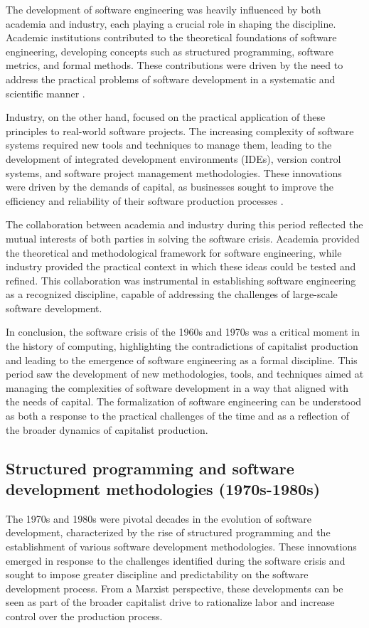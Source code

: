 \begin{refsection}
\begin{multicols}{2}
{The development of software engineering was heavily influenced by both academia and industry, each playing a crucial role in shaping the discipline. Academic institutions contributed to the theoretical foundations of software engineering, developing concepts such as structured programming, software metrics, and formal methods. These contributions were driven by the need to address the practical problems of software development in a systematic and scientific manner \cite{wirth1971programming}.

Industry, on the other hand, focused on the practical application of these principles to real-world software projects. The increasing complexity of software systems required new tools and techniques to manage them, leading to the development of integrated development environments (IDEs), version control systems, and software project management methodologies. These innovations were driven by the demands of capital, as businesses sought to improve the efficiency and reliability of their software production processes \cite{brooks1975mythical}.

The collaboration between academia and industry during this period reflected the mutual interests of both parties in solving the software crisis. Academia provided the theoretical and methodological framework for software engineering, while industry provided the practical context in which these ideas could be tested and refined. This collaboration was instrumental in establishing software engineering as a recognized discipline, capable of addressing the challenges of large-scale software development.

In conclusion, the software crisis of the 1960s and 1970s was a critical moment in the history of computing, highlighting the contradictions of capitalist production and leading to the emergence of software engineering as a formal discipline. This period saw the development of new methodologies, tools, and techniques aimed at managing the complexities of software development in a way that aligned with the needs of capital. The formalization of software engineering can be understood as both a response to the practical challenges of the time and as a reflection of the broader dynamics of capitalist production.

}
\subsection{Structured programming and software development methodologies (1970s-1980s)}
{\small
The 1970s and 1980s were pivotal decades in the evolution of software development, characterized by the rise of structured programming and the establishment of various software development methodologies. These innovations emerged in response to the challenges identified during the software crisis and sought to impose greater discipline and predictability on the software development process. From a Marxist perspective, these developments can be seen as part of the broader capitalist drive to rationalize labor and increase control over the production process.

}
\end{multicols}
\end{refsection}
